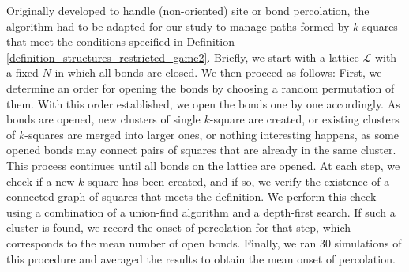         Originally developed to handle (non-oriented) site or bond percolation, the algorithm had to be adapted for our study to manage paths formed by $k$-squares that meet the conditions specified in Definition \ref{definition_structures_restricted_game2}. Briefly, we start with a lattice $\mathcal{L}$ with a fixed $N$ in which all bonds are closed. We then proceed as follows: First, we determine an order for opening the bonds by choosing a random permutation of them. With this order established, we open the bonds one by one accordingly. As bonds are opened, new clusters of single $k$-square are created, or existing clusters of $k$-squares are merged into larger ones, or nothing interesting happens, as some opened bonds may connect pairs of squares that are already in the same cluster. This process continues until all bonds on the lattice are opened. At each step, we check if a new $k$-square has been created, and if so, we verify the existence of a connected graph of squares that meets the definition. We perform this check using a combination of a union-find algorithm and a depth-first search. If such a cluster is found, we record the onset of percolation for that step, which corresponds to the mean number of open bonds. Finally, we ran 30 simulations of this procedure and averaged the results to obtain the mean onset of percolation.

